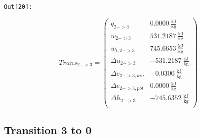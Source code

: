 \documentclass[11pt]{article}
\begin{document}
\texttt{\color{outcolor}Out[{\color{outcolor}20}]:}
    
    \begin{equation}
    Trans_{2->3} = \left( \begin{array}{ll}
        q_{2->3}            & 0.0000\ \frac{\mathrm{kJ}}{\mathrm{kg}}    \\
        w_{2->3}            & 531.2187\ \frac{\mathrm{kJ}}{\mathrm{kg}}  \\
        w_{t,2->3}          & 745.6653\ \frac{\mathrm{kJ}}{\mathrm{kg}}  \\
        \Delta u_{2->3}     & -531.2187\ \frac{\mathrm{kJ}}{\mathrm{kg}} \\
        \Delta e_{2->3,kin} & -0.0300\ \frac{\mathrm{kJ}}{\mathrm{kg}}   \\
        \Delta e_{2->3,pot} & 0.0000\ \frac{\mathrm{kJ}}{\mathrm{kg}}    \\
        \Delta h_{2->3}     & -745.6352\ \frac{\mathrm{kJ}}{\mathrm{kg}} \\
    \end{array} \right)
\end{equation}



    

    \subsection{Transition 3 to 0}\label{transition-3-to-0}
\end{document}
